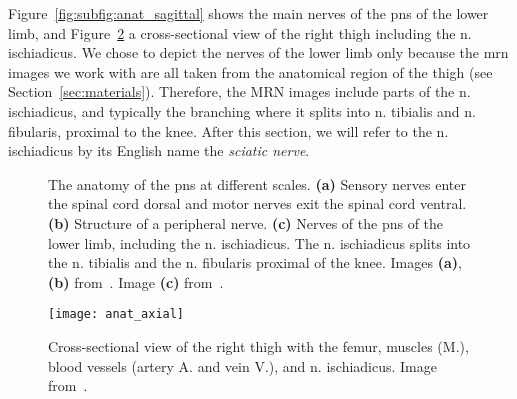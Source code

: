 Figure~\ref{fig:subfig:anat_sagittal} shows the main nerves of the \gls{pns} of the lower limb, and  Figure~\ref{fig:anat_axial} a cross-sectional view of the right thigh including the \gls{n.} ischiadicus. We chose to depict the nerves of the lower limb only because the \acrshort{mrn} images we work with are all taken from the anatomical region of the thigh (see Section~\ref{sec:materials}). Therefore, the MRN images include parts of the \gls{n.} ischiadicus, and typically the branching where it splits into \gls{n.} tibialis and \gls{n.} fibularis, proximal to the knee. After this section, we will refer to the \gls{n.} ischiadicus by its English name the \textit{sciatic nerve}.

\begin{figure}[htbp]
    \begin{minipage}[c][0.9\textheight][t]{.5\textwidth}
        \centering
        \vspace*{\fill}
        \vfill
    \end{minipage}
    \begin{minipage}[c][0.9\textheight][t]{.5\textwidth}
        \centering
        \vspace*{\fill}
    \end{minipage}
    \vspace*{-0.3cm}
    \caption[Anatomy of the Peripheral Nervous System]{The anatomy of the \gls{pns} at different scales. \textbf{(a)} Sensory nerves enter the spinal cord dorsal and motor nerves exit the spinal cord ventral.
    \textbf{(b)} Structure of a peripheral nerve.
    \textbf{(c)} Nerves of the \gls{pns} of the lower limb, including the \gls{n.} ischiadicus. The \gls{n.} ischiadicus splits into the \gls{n.} tibialis and the \gls{n.} fibularis proximal of the knee.
    Images \textbf{(a)}, \textbf{(b)} from~\cite{Schunke2015THIEMEAnatomy}. Image \textbf{(c)} from~\cite{Schunke2014PrometheusAnatomie}.}
    \label{fig:anat}
\end{figure}

\begin{figure}[htbp]
	\texttt{[image: anat\_axial]}
    \caption[Cross-section of the Right Thigh]{Cross-sectional view of the right thigh with the femur, muscles (M.), blood vessels (artery A. and vein V.), and \gls{n.} ischiadicus. Image from~\cite{Schunke2014PrometheusAnatomie}.}
    \label{fig:anat_axial}
\end{figure}

